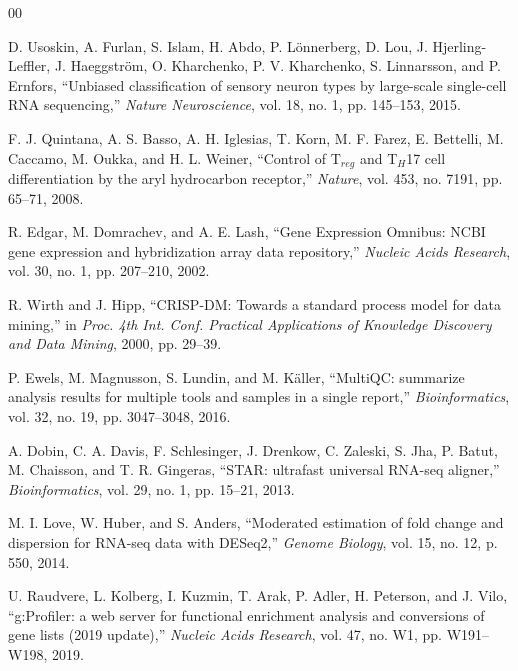 \documentclass[conference]{IEEEtran}
\begin{document}
\begin{thebibliography}{00}

D. Usoskin, A. Furlan, S. Islam, H. Abdo, P. Lönnerberg, D. Lou, J. Hjerling-Leffler, J. Haeggström, O. Kharchenko, P. V. Kharchenko, S. Linnarsson, and P. Ernfors, ``Unbiased classification of sensory neuron types by large-scale single-cell RNA sequencing,'' \textit{Nature Neuroscience}, vol. 18, no. 1, pp. 145--153, 2015.

F. J. Quintana, A. S. Basso, A. H. Iglesias, T. Korn, M. F. Farez, E. Bettelli, M. Caccamo, M. Oukka, and H. L. Weiner, ``Control of T$_{reg}$ and T$_H$17 cell differentiation by the aryl hydrocarbon receptor,'' \textit{Nature}, vol. 453, no. 7191, pp. 65--71, 2008.

R. Edgar, M. Domrachev, and A. E. Lash, ``Gene Expression Omnibus: NCBI gene expression and hybridization array data repository,'' \textit{Nucleic Acids Research}, vol. 30, no. 1, pp. 207--210, 2002.

R. Wirth and J. Hipp, ``CRISP-DM: Towards a standard process model for data mining,'' in \textit{Proc. 4th Int. Conf. Practical Applications of Knowledge Discovery and Data Mining}, 2000, pp. 29--39.

P. Ewels, M. Magnusson, S. Lundin, and M. Käller, ``MultiQC: summarize analysis results for multiple tools and samples in a single report,'' \textit{Bioinformatics}, vol. 32, no. 19, pp. 3047--3048, 2016.

A. Dobin, C. A. Davis, F. Schlesinger, J. Drenkow, C. Zaleski, S. Jha, P. Batut, M. Chaisson, and T. R. Gingeras, ``STAR: ultrafast universal RNA-seq aligner,'' \textit{Bioinformatics}, vol. 29, no. 1, pp. 15--21, 2013.

M. I. Love, W. Huber, and S. Anders, ``Moderated estimation of fold change and dispersion for RNA-seq data with DESeq2,'' \textit{Genome Biology}, vol. 15, no. 12, p. 550, 2014.

U. Raudvere, L. Kolberg, I. Kuzmin, T. Arak, P. Adler, H. Peterson, and J. Vilo, ``g:Profiler: a web server for functional enrichment analysis and conversions of gene lists (2019 update),'' \textit{Nucleic Acids Research}, vol. 47, no. W1, pp. W191--W198, 2019.

\end{thebibliography}
\end{document}
